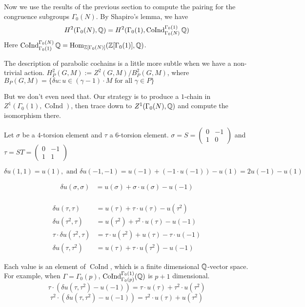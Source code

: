 \documentclass[12pt]{article}
\theoremstyle{definition}
\def\Z{{\Bbb Z}}
\def\Q{{\Bbb Q}}
\def\Hom{\text{Hom}}
\def\CoInd{\operatorname{CoInd}}
\begin{document}
Now we use the results of the previous section to compute the pairing for the congruence subgroups $\Gamma_0(N)$. By Shapiro's lemma, we have
	$$H^2(\Gamma_0(N),\Q)=H^2(\Gamma_0(1),\CoInd^{\Gamma_0(1)}_{\Gamma_0(N)}\Q)$$
Here $\CoInd^{\Gamma_0(N)}_{\Gamma_0(1)}\Q=\Hom_{\Z[\Gamma_0(N)]}(\Z[\Gamma_0(1)],\Q)$.

The description of parabolic cochains is a little more subtle when we have a non-trivial action. $H^2_P(G,M):= Z^2(G,M)/B^2_P(G,M)$, where $B_P(G, M)=\{ \delta u : u\in (\gamma-1)\cdot M \text{ for all } \gamma\in P\}$

But we don't even need that. Our strategy is to produce a $1$-chain in $Z^1(\Gamma_0(1),\CoInd)$, then trace down to $Z^1(\Gamma_0(N),\Q)$ and compute the isomorphism there. 

Let $\sigma$ be a $4$-torsion element and $\tau$ a $6$-torsion element. $\sigma=S=\begin{pmatrix} 0 & -1\\ 1 & 0\end{pmatrix}$ and $\tau=ST=\begin{pmatrix} 0 & -1 \\ 1 & 1\end{pmatrix}$


\begin{equation*}
	\delta u(1,1)=u(1), \text{ and } \delta u(-1,-1) =u(-1)+(-1\cdot u(-1))-u(1)=2u(-1)-u(1)
\end{equation*}

\begin{align*}
\delta u(\sigma,\sigma) &=u(\sigma)+\sigma\cdot u(\sigma)-u(-1)\\
\end{align*}

\begin{align*}
\delta u (\tau,\tau) & = u(\tau) +\tau\cdot u(\tau) - u(\tau^2)\\
\delta u(\tau^2,\tau) & = u(\tau^2) +\tau^2\cdot u(\tau) - u(-1)\\
\tau\cdot \delta u(\tau^2,\tau) &= \tau\cdot u(\tau^2) + u(\tau) -\tau\cdot u(-1)\\
\delta u(\tau,\tau^2) & = u(\tau)+\tau\cdot u(\tau^2)- u(-1)
\end{align*}

Each value is an element of $\CoInd$, which is a finite dimensional $\Q$-vector space. For example, when $\Gamma=\Gamma_0(p)$, $\CoInd^{\Gamma_0(1)}_{\Gamma_0(p)}(\Q)$ is $p+1$ dimensional. 
$$\tau\cdot( \delta u(\tau,\tau^2) -u(-1)) = \tau\cdot u(\tau)+\tau^2 \cdot u(\tau^2)$$
$$\tau^{2} \cdot(\delta u(\tau,\tau^2) - u(-1)) =  \tau^{2}\cdot u(\tau) +u(\tau^2)$$
\end{document}
